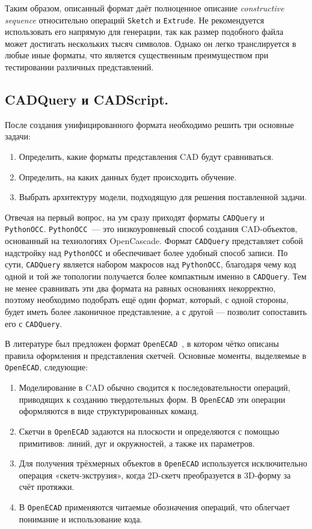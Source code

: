 Таким образом, описанный формат даёт полноценное описание \textit{constructive sequence}
относительно операций \texttt{Sketch} и \texttt{Extrude}. Не рекомендуется использовать его напрямую для генерации,
так как размер подобного файла может достигать нескольких тысяч символов.
Однако он легко транслируется в любые иные форматы, что является существенным преимуществом при тестировании различных представлений.

\subsection{CADQuery и CADScript.}

После создания унифицированного формата необходимо решить три основные задачи:
\begin{enumerate}
    \item Определить, какие форматы представления CAD будут сравниваться.
    \item Определить, на каких данных будет происходить обучение.
    \item Выбрать архитектуру модели, подходящую для решения поставленной задачи.
\end{enumerate}

Отвечая на первый вопрос, на ум сразу приходят форматы \texttt{CADQuery} и \texttt{PythonOCC}.
\texttt{PythonOCC}~— это низкоуровневый способ создания CAD-объектов, основанный на технологиях OpenCascade.
Формат \texttt{CADQuery} представляет собой надстройку над \texttt{PythonOCC} и обеспечивает более удобный
способ записи. По сути, \texttt{CADQuery} является набором макросов над \texttt{PythonOCC}, благодаря чему
код одной и той же топологии получается более компактным именно в \texttt{CADQuery}. Тем не менее
сравнивать эти два формата на равных основаниях некорректно, поэтому необходимо подобрать ещё один формат,
который, с одной стороны, будет иметь более лаконичное представление, а с другой --- позволит сопоставить его
с \texttt{CADQuery}.

В литературе был предложен формат \texttt{OpenECAD}~\cite{yuan24_openecad}, в котором чётко описаны правила
оформления и представления скетчей. Основные моменты, выделяемые в \texttt{OpenECAD}, следующие:
\begin{enumerate}
    \item Моделирование в CAD обычно сводится к последовательности операций, приводящих к созданию твердотельных форм.
          В \texttt{OpenECAD} эти операции оформляются в виде структурированных команд.
    \item Скетчи в \texttt{OpenECAD} задаются на плоскости и определяются с помощью примитивов:
          линий, дуг и окружностей, а также их параметров.
    \item Для получения трёхмерных объектов в \texttt{OpenECAD} используется исключительно операция
          «скетч-экструзия», когда 2D-скетч преобразуется в 3D-форму за счёт протяжки.
    \item В \texttt{OpenECAD} применяются читаемые обозначения операций, что облегчает понимание
          и использование кода.
\end{enumerate}

